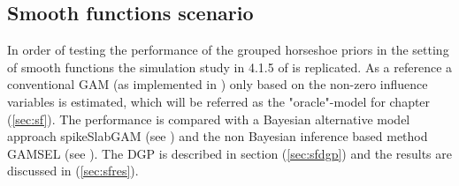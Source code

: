 \documentclass[12pt,letterpaper]{article}
\numberwithin{equation}{subsection}
\begin{document}
\FloatBarrier
\subsection{Smooth functions scenario}
In order of testing the performance of the grouped horseshoe priors in the setting of smooth functions the simulation study in 4.1.5 of \cite{scheipl} is replicated. As a reference a conventional GAM (as implemented in \cite{gam}) only based on the non-zero influence variables is estimated, which will be referred as the "oracle"-model for chapter (\ref{sec:sf}). The performance is compared with a Bayesian alternative model approach spikeSlabGAM (see \cite{scheipl}) and the non Bayesian inference based method GAMSEL (see \cite{gamsel}). The DGP is described in section (\ref{sec:sfdgp}) and the results are discussed in (\ref{sec:sfres}).
\label{sec:sf}
\end{document}
